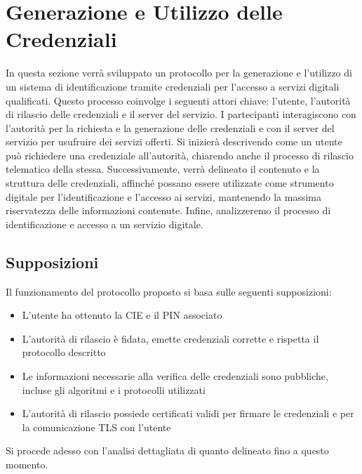     \section{Generazione e Utilizzo delle Credenziali}
        In questa sezione verrà sviluppato un protocollo per la generazione e l'utilizzo di un sistema di identificazione tramite credenziali per l'accesso a servizi digitali qualificati.
        Questo processo coinvolge i seguenti attori chiave: l'utente, l'autorità di rilascio delle credenziali e il server del servizio.
        I partecipanti interagiscono con l'autorità per la richiesta e la generazione delle credenziali e con il server del servizio per usufruire dei servizi offerti.
        Si inizierà descrivendo come un utente può richiedere una credenziale all'autorità, chiarendo anche il processo di rilascio telematico della stessa.
        Successivamente, verrà delineato il contenuto e la struttura delle credenziali, affinché possano essere utilizzate come strumento digitale per l'identificazione e l'accesso ai servizi, mantenendo la massima riservatezza delle informazioni contenute.
        Infine, analizzeremo il processo di identificazione e accesso a un servizio digitale.
                
        \subsection{Supposizioni}
            Il funzionamento del protocollo proposto si basa sulle seguenti supposizioni:

            \begin{itemize}
                \item L'utente ha ottenuto la CIE e il PIN associato

                \item L'autorità di rilascio è fidata, emette credenziali corrette e rispetta il protocollo descritto

                \item Le informazioni necessarie alla verifica delle credenziali sono pubbliche, incluse gli algoritmi e i protocolli utilizzati

                \item L'autorità di rilascio possiede certificati validi per firmare le credenziali e per la comunicazione TLS con l'utente
            \end{itemize}

            \noindent Si procede adesso con l’analisi dettagliata di quanto delineato fino a questo momento.


